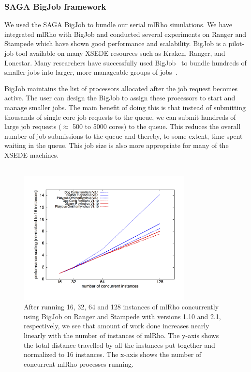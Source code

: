 \documentclass{sig-alternate}
\begin{document}
\subsubsection{SAGA BigJob framework}
\label{sec:bigjob}

We used the SAGA BigJob to bundle our serial mlRho simulations. We have integrated mlRho with
BigJob and conducted several experiments on Ranger and Stampede which have shown good performance and
scalability.  BigJob is a pilot-job tool available on many XSEDE resources such as Kraken, Ranger, and
Lonestar. Many researchers have successfully used BigJob~\cite{saga_bigjob_condor_cloud} to bundle hundreds of smaller jobs into larger, more manageable groups of jobs~\cite{Luckow:2008fp, async_repex11}.

BigJob maintains the list of processors allocated after the job request becomes active. The
user can design the BigJob to assign these processors to start and manage smaller jobs. The main benefit of doing this is that instead of submitting
thousands of single core job requests to the queue, we can submit hundreds of large job requests ($\approx$
500 to 5000 cores) to the queue. This reduces the overall number of job submissions to the queue and thereby,
to some extent, time spent waiting in the queue. This job size is also more appropriate for many of the XSEDE
machines.\\
\\



\begin{figure}[t] %
\centering
\includegraphics[width=0.78\textwidth]{figures/bj-scaling.png}
\caption{After running 16, 32, 64 and 128 instances of mlRho concurrently using BigJob on Ranger and Stampede with versions 1.10 and 2.1, respectively, we see that amount of work done increases nearly linearly with the number of instances of mlRho. The y-axis shows the total distance travelled by all the instances put together and normalized to 16 instances. The x-axis shows the number of concurrent mlRho processes running. }
\label{fig:bj-scaling}
\end{figure}
\end{document}
